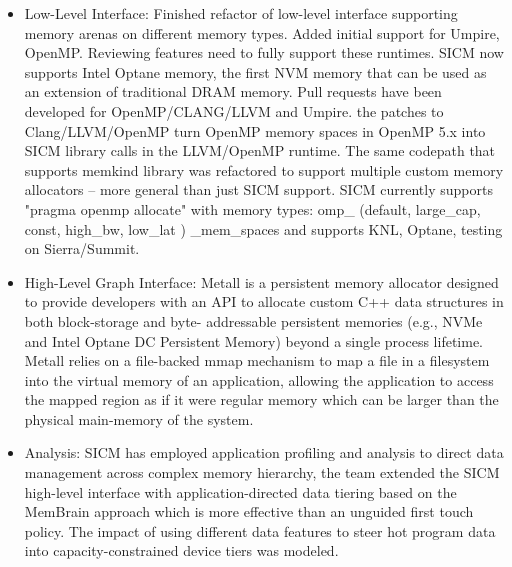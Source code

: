\begin{itemize}
\item  Low-Level Interface: Finished refactor of low-level interface supporting memory arenas on different memory types. Added initial support for Umpire, OpenMP. Reviewing features need to fully support these runtimes. SICM now supports Intel Optane memory, the first NVM memory that can be used as an extension of traditional DRAM memory.
Pull requests have been developed for OpenMP/CLANG/LLVM and Umpire. the patches to Clang/LLVM/OpenMP turn OpenMP memory spaces in OpenMP 5.x into SICM library calls in the LLVM/OpenMP runtime. The same codepath that supports memkind library was refactored to support multiple custom memory allocators – more general than just SICM support.
SICM currently supports "pragma openmp allocate" with  memory types: omp\_ (default, large\_cap, const, high\_bw, low\_lat ) \_mem\_spaces and supports KNL, Optane, testing on Sierra/Summit.
\item  High-Level Graph Interface: Metall is a persistent memory allocator designed to provide developers with an API to allocate custom C++ data structures in both block-storage and byte- addressable persistent memories (e.g., NVMe and Intel Optane DC Persistent Memory) beyond a single process lifetime. Metall relies on a file-backed mmap mechanism to map a file in a filesystem into the virtual memory of an application, allowing the application to access the mapped region as if it were regular memory which can be larger than the physical main-memory of the system.
\item Analysis: 
SICM has employed application profiling and analysis to direct data management across complex memory hierarchy, the team extended the SICM high-level interface with application-directed data tiering based on the MemBrain approach which is more effective than an unguided first touch policy.  The impact of using different data features to steer hot program data into capacity-constrained device tiers was modeled.
\end{itemize}
